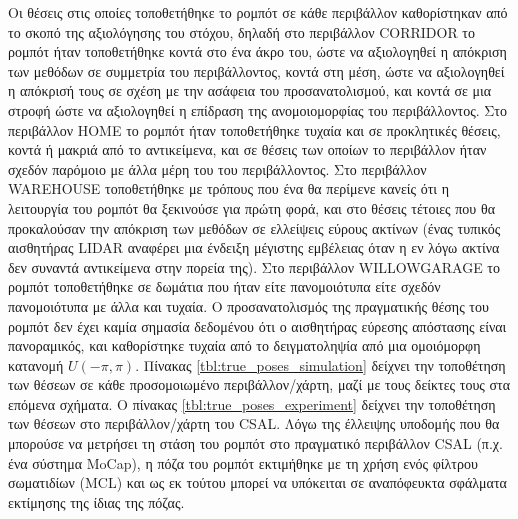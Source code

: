 Οι θέσεις στις οποίες τοποθετήθηκε το ρομπότ σε κάθε περιβάλλον καθορίστηκαν
από το σκοπό της αξιολόγησης του στόχου, δηλαδή στο περιβάλλον CORRIDOR το ρομπότ ήταν
τοποθετήθηκε κοντά στο ένα άκρο του, ώστε να αξιολογηθεί η απόκριση των μεθόδων σε
συμμετρία του περιβάλλοντος, κοντά στη μέση, ώστε να αξιολογηθεί η απόκρισή τους
σε σχέση με την ασάφεια του προσανατολισμού, και κοντά σε μια στροφή ώστε να αξιολογηθεί η
επίδραση της ανομοιομορφίας του περιβάλλοντος. Στο περιβάλλον HOME το ρομπότ ήταν
τοποθετήθηκε τυχαία και σε προκλητικές θέσεις, κοντά ή μακριά από το
αντικείμενα, και σε θέσεις των οποίων το περιβάλλον ήταν σχεδόν παρόμοιο με άλλα μέρη του
του περιβάλλοντος. Στο περιβάλλον WAREHOUSE τοποθετήθηκε με τρόπους που ένα
θα περίμενε κανείς ότι η λειτουργία του ρομπότ θα ξεκινούσε για πρώτη φορά, και στο
θέσεις τέτοιες που θα προκαλούσαν την απόκριση των μεθόδων σε ελλείψεις εύρους
ακτίνων (ένας τυπικός αισθητήρας LIDAR αναφέρει μια ένδειξη μέγιστης εμβέλειας όταν η εν λόγω ακτίνα
δεν συναντά αντικείμενα στην πορεία της). Στο περιβάλλον WILLOWGARAGE το ρομπότ
τοποθετήθηκε σε δωμάτια που ήταν είτε πανομοιότυπα είτε σχεδόν πανομοιότυπα με άλλα
και τυχαία. Ο προσανατολισμός της πραγματικής θέσης του ρομπότ δεν έχει καμία σημασία
δεδομένου ότι ο αισθητήρας εύρεσης απόστασης είναι πανοραμικός, και καθορίστηκε τυχαία από το
δειγματοληψία από μια ομοιόμορφη κατανομή $U(-\pi,\pi)$. Πίνακας
\ref{tbl:true_poses_simulation} δείχνει την τοποθέτηση των θέσεων σε κάθε
προσομοιωμένο περιβάλλον/χάρτη, μαζί με τους δείκτες τους στα επόμενα σχήματα.
Ο πίνακας \ref{tbl:true_poses_experiment} δείχνει την τοποθέτηση των θέσεων στο
περιβάλλον/χάρτη του CSAL. Λόγω της έλλειψης υποδομής που θα μπορούσε να μετρήσει
τη στάση του ρομπότ στο πραγματικό περιβάλλον CSAL (π.χ. ένα σύστημα MoCap), η
πόζα του ρομπότ εκτιμήθηκε με τη χρήση ενός φίλτρου σωματιδίων (MCL) και
ως εκ τούτου μπορεί να υπόκειται σε αναπόφευκτα σφάλματα εκτίμησης της ίδιας της πόζας.

